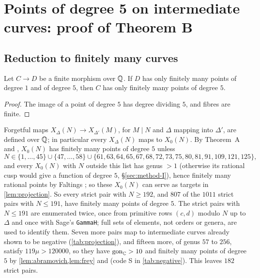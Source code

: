 \section{Points of degree 5 on intermediate curves: proof of Theorem B}\label{sec:quintic-intermediate}

\subsection{Reduction to finitely many curves}
\begin{lemma}[Projection]\label{lem:projection}
Let $C\to D$ be a finite morphism over $\mathbb{Q}$. If $D$ has only finitely many points of degree $1$ and of degree
$5$, then $C$ has only finitely many points of degree $5$.
\end{lemma}
\begin{proof}
The image of a point of degree $5$ has degree dividing $5$, and fibres are finite.
\end{proof}
Forgetful maps $X_\Delta(N)\to X_{\Delta'}(M)$, for $M\mid N$ and $\Delta$ mapping into $\Delta'$, are defined
over $\mathbb{Q}$; in particular every $X_\Delta(N)$ maps to $X_0(N)$. By Theorem~A and \cite[Theorem~1.10]{DHJO},
$X_0(N)$ has finitely many points of degree $5$ unless
\[
 N\in\{1,\dots,45\}\cup\{47,\dots,58\}\cup\{61,63,64,65,67,68,72,73,75,80,81,91,109,121,125\},
\]
and every $X_0(N)$ with $N$ outside this list has genus $>1$ (otherwise its rational cusp would give a
function of degree $5$, \S\ref{sec:method-I}), hence finitely many rational points by Faltings
\cite{Faltings1991}; so these $X_0(N)$ can serve as targets in \cref{lem:projection}. So every strict pair with $N\ge192$, and $807$ of the $1011$
strict pairs with $N\le191$, have finitely many points of degree $5$. The strict pairs with $N\le191$ are
enumerated twice, once from primitive rows $(c,d)$ modulo $N$ up to $\Delta$ and once with Sage's
\texttt{GammaH}; full sets of elements, not orders or genera, are used to identify them. Seven more pairs map to
intermediate curves already shown to be negative (\cref{tab:projection}), and fifteen more, of genus $57$ to
$256$, satisfy $119\mu>120000$, so they have $\operatorname{gon}_{\mathbb C}>10$ and finitely many points of degree $5$ by
\cref{lem:abramovich,lem:frey} and \cite[Proposition~2.2]{DerickxSutherland2017} (code S in \cref{tab:negative}). This leaves $182$ strict pairs.

